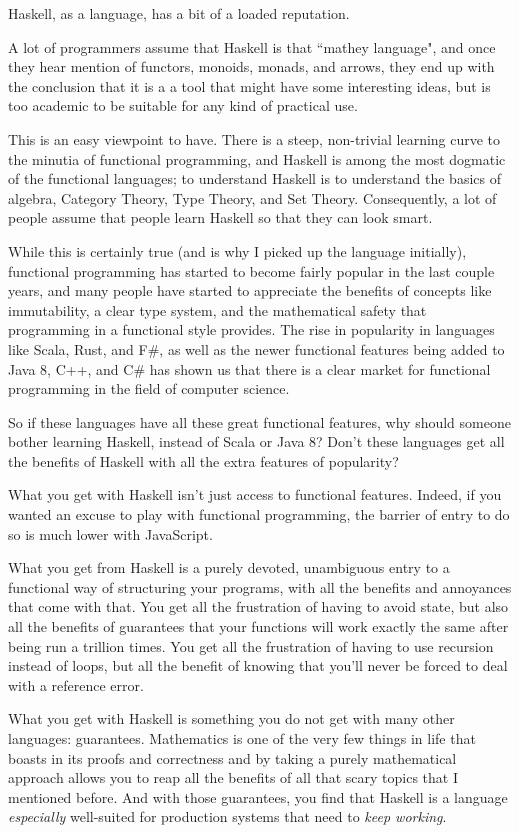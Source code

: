 \begin{foreword}

Haskell, as a language, has a bit of a loaded reputation.  

A lot of programmers assume that Haskell is that ``mathey language", and once they hear mention of functors, monoids, monads, and arrows, they end up with the conclusion that it is a a tool that might have some interesting ideas, but is too academic to be suitable for any kind of practical use. 

This is an easy viewpoint to have.  There is a steep, non-trivial learning curve to the minutia of functional programming, and Haskell is among the most dogmatic of the functional languages; to understand Haskell is to understand the basics of algebra, Category Theory, Type Theory, and Set Theory.  Consequently, a lot of people assume that people learn Haskell so that they can look smart. 

While this is certainly true (and is why I picked up the language initially), functional programming has started to become fairly popular in the last couple years, and many people have started to appreciate the benefits of concepts like immutability, a clear type system, and the mathematical safety that programming in a functional style provides. The rise in popularity in languages like Scala, Rust, and F\#, as well as the newer functional features being added to Java 8, C++, and C\# has shown us that there is a clear market for functional programming in the field of computer science. 

So if these languages have all these great functional features, why should someone bother learning Haskell, instead of Scala or Java 8?  Don't these languages get all the benefits of Haskell with all the extra features of popularity? 

What you get with Haskell isn't just access to functional features.  Indeed, if you wanted an excuse to play with functional programming, the barrier of entry to do so is much lower with JavaScript.  

What you get from Haskell is a purely devoted, unambiguous entry to a functional way of structuring your programs, with all the benefits and annoyances that come with that. You get all the frustration of having to avoid state, but also all the benefits of guarantees that your functions will work exactly the same after being run a trillion times. You get all the frustration of having to use recursion instead of loops, but all the benefit of knowing that you'll never be forced to deal with a  reference error. 

What you get with Haskell is something you do not get with many other languages: guarantees. Mathematics is one of the very few things in life that boasts in its proofs and correctness and by taking a purely mathematical approach allows you to reap all the benefits of all that scary topics that I mentioned before. 
And with those guarantees, you find that Haskell is a language \textit{especially} well-suited for production systems that need to \textit{keep working}. 


\end{foreword}

